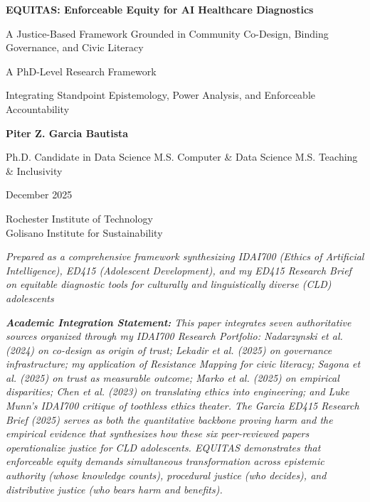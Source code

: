 \documentclass[12pt,a4paper]{article}
\begin{document}
\begin{titlepage}
\centering
\vspace*{2.5cm}

{\Large \textbf{EQUITAS: Enforceable Equity for AI Healthcare Diagnostics}}

\vspace{0.6cm}

{\large A Justice-Based Framework Grounded in Community Co-Design, Binding Governance, and Civic Literacy}

\vspace{1.6cm}

{\normalsize A PhD-Level Research Framework}

\vspace{1.6cm}

{\normalsize Integrating Standpoint Epistemology, Power Analysis, and Enforceable Accountability}

\vspace{2.4cm}

{\large \textbf{Piter Z. Garcia Bautista} \par}
{\large Ph.D. Candidate in Data Science \textbullet{} M.S. Computer \& Data Science \textbullet{} M.S. Teaching \& Inclusivity}

\vspace{0.3cm}

{\normalsize December 2025}

\vspace{2.5cm}

{\small Rochester Institute of Technology \\ Golisano Institute for Sustainability}

\vfill

{
\footnotesize \textit{Prepared as a comprehensive framework synthesizing IDAI700 (Ethics of Artificial Intelligence), ED415 (Adolescent Development), and my ED415 Research Brief on equitable diagnostic tools for culturally and linguistically diverse (CLD) adolescents} \\

\vspace{0.3cm}

\textit{\tiny\textbf{Academic Integration Statement:} This paper integrates seven authoritative sources organized through my IDAI700 Research Portfolio: Nadarzynski et al. (2024) on co-design as origin of trust; Lekadir et al. (2025) on governance infrastructure; my application of Resistance Mapping for civic literacy; Sagona et al. (2025) on trust as measurable outcome; Marko et al. (2025) on empirical disparities; Chen et al. (2023) on translating ethics into engineering; and Luke Munn's IDAI700 critique of toothless ethics theater. The Garcia ED415 Research Brief (2025) serves as both the quantitative backbone proving harm and the empirical evidence that synthesizes how these six peer-reviewed papers operationalize justice for CLD adolescents. EQUITAS demonstrates that enforceable equity demands simultaneous transformation across epistemic authority (whose knowledge counts), procedural justice (who decides), and distributive justice (who bears harm and benefits).}
}

\end{titlepage}
\end{document}
